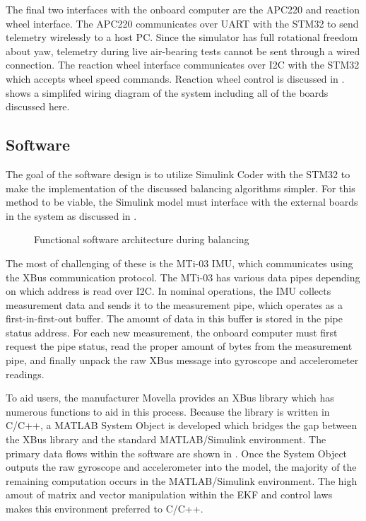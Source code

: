 The final two interfaces with the onboard computer are the APC220 and reaction wheel interface. The APC220 communicates over UART with the STM32 to send telemetry wirelessly to a host PC. Since the simulator has full rotational freedom about yaw, telemetry during live air-bearing tests cannot be sent through a wired connection. The reaction wheel interface communicates over I2C with the STM32 which accepts wheel speed commands. Reaction wheel control is discussed in \cite{nalley2025development}.  shows a simplifed wiring diagram of the system including all of the boards discussed here.


\subsection{Software}\label{sec:software}

The goal of the software design is to utilize Simulink Coder with the STM32 to make the implementation of the discussed balancing algorithms simpler. For this method to be viable, the Simulink model must interface with the external boards in the system as discussed in . 

\begin{figure}
    \centering
    
    \caption{Functional software architecture during balancing}
    \label{fig:software_flowchart}
\end{figure}

The most of challenging of these is the MTi-03 IMU, which communicates using the XBus communication protocol. The MTi-03 has various data pipes depending on which address is read over I2C. In nominal operations, the IMU collects measurement data and sends it to the measurement pipe, which operates as a first-in-first-out buffer. The amount of data in this buffer is stored in the pipe status address. For each new measurement, the onboard computer must first request the pipe status, read the proper amount of bytes from the measurement pipe, and finally unpack the raw XBus message into gyroscope and accelerometer readings. 

To aid users, the manufacturer Movella provides an XBus library which has numerous functions to aid in this process. Because the library is written in C/C++, a MATLAB System Object is developed which bridges the gap between the XBus library and the standard MATLAB/Simulink environment. The primary data flows within the software are shown in . Once the System Object outputs the raw gyroscope and accelerometer into the model, the majority of the remaining computation occurs in the MATLAB/Simulink environment. The high amout of matrix and vector manipulation within the EKF and control laws makes this environment preferred to C/C++. 


